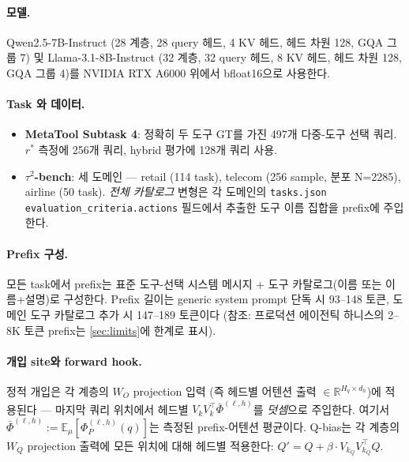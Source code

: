 \documentclass{article}
\theoremstyle{definition}
\newcommand{\R}{\mathbb{R}}
\newcommand{\E}{\mathbb{E}}
\newcommand{\bphi}{\bar{\Phi}}
\newcommand{\Phip}{\Phi_P}
\newcommand{\dh}{d_h}
\newcommand{\Hq}{H_q}
\begin{document}
\paragraph{모델.}
Qwen2.5-7B-Instruct (28 계층, 28 query 헤드, 4 KV 헤드, 헤드 차원 128, GQA 그룹 7) 및 Llama-3.1-8B-Instruct (32 계층, 32 query 헤드, 8 KV 헤드, 헤드 차원 128, GQA 그룹 4)를 NVIDIA RTX A6000 위에서 bfloat16으로 사용한다.

\paragraph{Task 와 데이터.}
\begin{itemize}[leftmargin=*]
\item \textbf{MetaTool Subtask 4}: 정확히 두 도구 GT를 가진 497개 다중-도구 선택 쿼리. $r^*$ 측정에 256개 쿼리, hybrid 평가에 128개 쿼리 사용.
\item \textbf{$\tau^2$-bench}: 세 도메인 --- retail (114 task), telecom (256 sample, 분포 N=2285), airline (50 task). \emph{전체 카탈로그} 변형은 각 도메인의 \texttt{tasks.json} \texttt{evaluation\_criteria.actions} 필드에서 추출한 도구 이름 집합을 prefix에 주입한다.
\end{itemize}

\paragraph{Prefix 구성.}
모든 task에서 prefix는 표준 도구-선택 시스템 메시지 + 도구 카탈로그(이름 또는 이름+설명)로 구성한다. Prefix 길이는 generic system prompt 단독 시 93--148 토큰, 도메인 도구 카탈로그 추가 시 147--189 토큰이다 (참조: 프로덕션 에이전틱 하니스의 2--8K 토큰 prefix는 \cref{sec:limits}에 한계로 표시).

\paragraph{개입 site와 forward hook.}
정적 개입은 각 계층의 $W_O$ projection 입력 (즉 헤드별 어텐션 출력 $\in \R^{\Hq\times \dh}$)에 적용된다 --- 마지막 쿼리 위치에서 헤드별 $V_k V_k^\top \bphi^{(\ell,h)}$를 \emph{덧셈}으로 주입한다. 여기서 $\bphi^{(\ell,h)} := \E_\mu[\Phip^{(\ell,h)}(q)]$는 측정된 prefix-어텐션 평균이다. Q-bias는 각 계층의 $W_Q$ projection 출력에 모든 위치에 대해 헤드별 적용한다: $Q' = Q + \beta\cdot V_{k_{Q}} V_{k_{Q}}^\top Q$.
\end{document}
